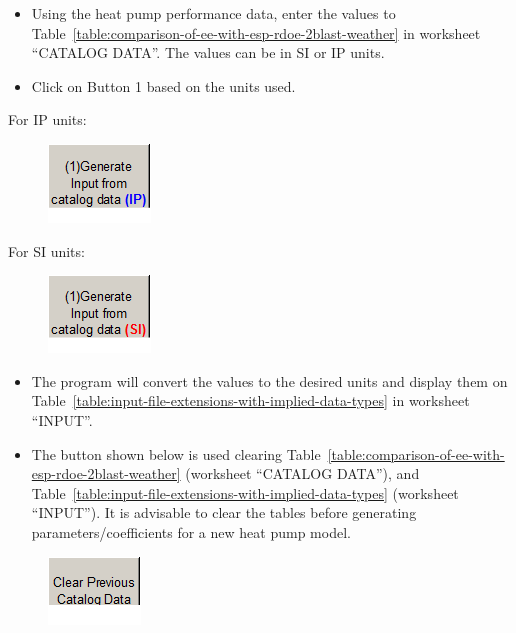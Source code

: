 \begin{itemize}
\item
  Using the heat pump performance data, enter the values to Table~\ref{table:comparison-of-ee-with-esp-rdoe-2blast-weather} in worksheet ``CATALOG DATA''. The values can be in SI or IP units.
\item
  Click on Button 1 based on the units used.
\end{itemize}

For IP units:

\begin{figure}[htbp]
\centering
\includegraphics{media/image037.png}
\caption{}
\end{figure}

For SI units:

\begin{figure}[htbp]
\centering
\includegraphics{media/image038.png}
\caption{}
\end{figure}

\begin{itemize}
\item
  The program will convert the values to the desired units and display them on Table~\ref{table:input-file-extensions-with-implied-data-types} in worksheet ``INPUT''.
\item
  The button shown below is used clearing Table~\ref{table:comparison-of-ee-with-esp-rdoe-2blast-weather} (worksheet ``CATALOG DATA''), and Table~\ref{table:input-file-extensions-with-implied-data-types} (worksheet ``INPUT''). It is advisable to clear the tables before generating parameters/coefficients for a new heat pump model.
\end{itemize}

\begin{figure}[htbp]
\centering
\includegraphics{media/image039.png}
\caption{}
\end{figure}

